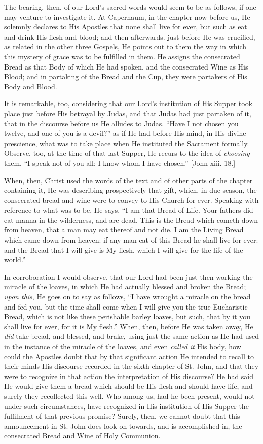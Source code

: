 The bearing, then, of our Lord's sacred words would seem to be as
follows, if one may venture to investigate it. At Capernaum, in the
chapter now before us, He solemnly declares to His Apostles that none
shall live for ever, but such as eat and drink His flesh and blood;
and then afterwards. just before He was crucified, as related in the
other three Gospels, He points out to them the way in which this
mystery of grace was to be fulfilled in them. He assigns the
consecrated Bread as that Body of which He had spoken, and the
consecrated Wine as His Blood; and in partaking of the Bread and the
Cup, they were partakers of His Body and Blood.

It is remarkable, too, considering that our Lord's institution of
His Supper took place just before His betrayal by Judas, and that
Judas had just partaken of it, that in the discourse before us He
alludes to Judas. ``Have I not chosen you twelve, and one of you
is a devil?'' as if He had before His mind, in His divine
prescience, what was to take place when He instituted the Sacrament
formally. Observe, too, at the time of that last Supper, He recurs to
the idea of \emph{choosing} them. ``I speak not of you all; I know
whom I have chosen.'' [John xiii. 18.]

When, then, Christ used the words of the text and of other parts of
the chapter containing it, He was describing prospectively that gift,
which, in due season, the consecrated bread and wine were to convey to
His Church for ever. Speaking with reference to what was to be, He
says, ``I am that Bread of Life. Your fathers did eat manna in the
wilderness, and are dead. This is the Bread which cometh down from
heaven, that a man may eat thereof and not die. I am the Living Bread
which came down from heaven: if any man eat of this Bread he shall
live for ever: and the Bread that I will give is My flesh, which I
will give for the life of the world.''

In corroboration I would observe, that our Lord had been just then
working the miracle of the loaves, in which He had actually blessed
and broken the Bread; \emph{upon this}, He goes on to say as follows,
``I have wrought a miracle on the bread and fed you, but the time
shall come when I will give you the true Eucharistic Bread, which is
not like these perishable barley loaves, but such, that by it you
shall live for ever, for it is My flesh.'' When, then, before He
was taken away, He \emph{did} take bread, and blessed, and brake,
using just the same action as He had used in the instance of the
miracle of the loaves, and even \emph{called it} His body, how could
the Apostles doubt that by that significant action He intended to
recall to their minds His discourse recorded in the sixth chapter of
St. John, and that they were to recognize in that action the
interpretation of His discourse? He had said He would give them a
bread which should be His flesh and should have life, and surely they
recollected this well. Who among us, had he been present, would not
under such circumstances, have recognized in His institution of His
Supper the fulfilment of that previous promise? Surely, then, we
cannot doubt that this announcement in St. John does look on towards,
and is accomplished in, the consecrated Bread and Wine of Holy
Communion.


